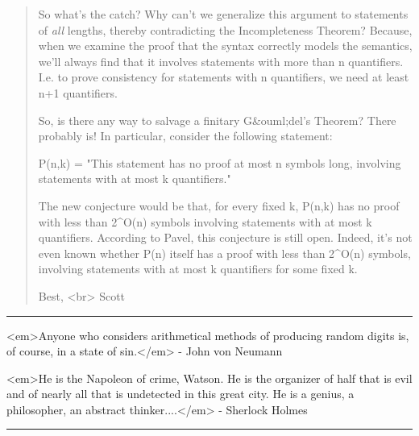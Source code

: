\begin{quote}
 So what's the catch?  Why can't we generalize this argument to
 statements of \emph{all} lengths, thereby contradicting the Incompleteness
 Theorem?  Because, when we examine the proof that the syntax correctly
 models the semantics, we'll always find that it involves statements
 with more than n quantifiers.  I.e. to prove consistency for
 statements with n quantifiers, we need at least n+1 quantifiers.

 So, is there any way to salvage a finitary G&ouml;del's Theorem?  There
 probably is!  In particular, consider the following statement:
 
 P(n,k) = "This statement has no proof at most n symbols long,
 involving statements with at most k quantifiers."

 The new conjecture would be that, for every fixed k, P(n,k) has no
 proof with less than 2^{O(n)} symbols involving statements with at 
 most k quantifiers.  According to Pavel, this conjecture is still open.
 Indeed, it's not even known whether P(n) itself has a proof with less
 than 2^{O(n)} symbols, involving statements with at most k quantifiers
 for some fixed k.

 Best, <br>
 Scott
\end{quote}



\par\noindent\rule{\textwidth}{0.4pt}
<em>Anyone who considers arithmetical methods of producing random digits 
is, of course, in a state of sin.</em> - John von Neumann 

<em>He is the Napoleon of crime, Watson.  He is the organizer of half 
that is evil and of nearly all that is undetected in this great city.
He is a genius, a philosopher, an abstract thinker....</em> - Sherlock Holmes

\par\noindent\rule{\textwidth}{0.4pt}

